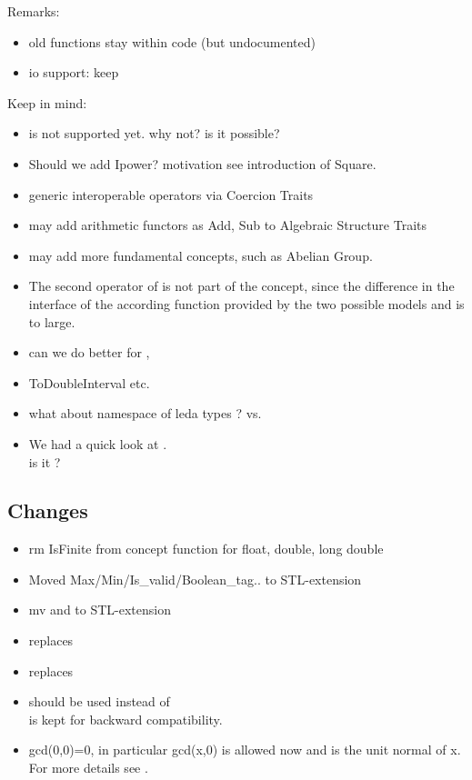 Remarks:
\begin{itemize}
\item old functions stay within code (but undocumented)
\item io support: keep  
\end{itemize}

Keep in mind: 
\begin{itemize}
\item {} is not supported yet. why not? is it possible?  
\item Should we add Ipower? motivation see introduction of Square. 
\item generic interoperable operators via Coercion Traits
\item may add arithmetic functors as Add, Sub to Algebraic Structure Traits
\item may add more fundamental concepts, such as Abelian Group.
\item The second operator of  is not 
        part of the concept, since the difference in the interface of the 
        according function provided by the two possible models 
        and  is to large.  
\item can we do better for , 
\item ToDoubleInterval etc. 
\item what about namespace of leda types ? 
      vs. 
\item We had a quick look at . \\ 
      is it ?
\end{itemize}

\subsection{Changes}
\begin{itemize}
\item rm IsFinite from  concept
      function  for float, double, long double 
\item Moved Max/Min/Is\_valid/Boolean\_tag.. to STL-extension 
\item mv  and  
      to STL-extension
\item {} replaces 
\item {} replaces  
\item {} should be used instead of \\
       is kept for backward compatibility.
\item gcd(0,0)=0, in particular gcd(x,0) is allowed now and is the unit normal 
      of x. For more details see . \\
\end{itemize}


